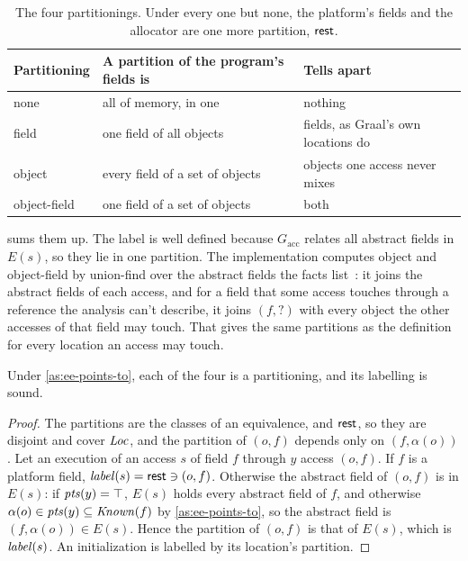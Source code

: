 \begin{table}[t]
\centering
\begin{tabular}{@{}lll@{}}
\toprule
Partitioning & A partition of the program's fields is & Tells apart \\
\midrule
none & all of memory, in one & nothing \\
field & one field of all objects & fields, as Graal's own locations do \\
object & every field of a set of objects & objects one access never mixes \\
object-field & one field of a set of objects & both \\
\bottomrule
\end{tabular}
\caption{The four partitionings. Under every one but none, the platform's
fields and the allocator are one more partition, $\mathsf{rest}$.}
\label{tab:ee-partitionings}
\end{table}

 sums them up. The label is well defined because
$G_{\mathrm{acc}}$ relates all abstract fields in $E(s)$, so they lie in one
partition. The implementation computes object and object-field by union-find
over the abstract fields the facts list~\cite{steensgaard1996points}: it joins
the abstract fields of each access, and for a field that some access touches
through a reference the analysis can't describe, it joins $(f, ?)$ with every
object the other accesses of that field may touch. That gives the same
partitions as the definition for every location an access may touch.

\begin{proposition}\label{prop:ee-sound-labels}
Under \cref{as:ee-points-to}, each of the four is a partitioning, and its
labelling is sound.
\end{proposition}

\begin{proof}
The partitions are the classes of an equivalence, and $\mathsf{rest}$, so they are
disjoint and cover $\mathit{Loc}$, and the partition of $(o, f)$ depends only on
$(f, \alpha(o))$. Let an execution of an access $s$ of field $f$ through $y$
access $(o, f)$. If $f$ is a platform field, $\mathit{label}(s) = \mathsf{rest} \ni (o, f)$.
Otherwise the abstract field of $(o, f)$ is in $E(s)$: if $\mathit{pts}(y) = \top$,
$E(s)$ holds every abstract field of $f$, and otherwise
$\alpha(o) \in \mathit{pts}(y) \subseteq \mathit{Known}(f)$ by \cref{as:ee-points-to},
so the abstract field is $(f, \alpha(o)) \in E(s)$. Hence the partition of
$(o, f)$ is that of $E(s)$, which is $\mathit{label}(s)$. An initialization is labelled
by its location's partition.
\end{proof}

